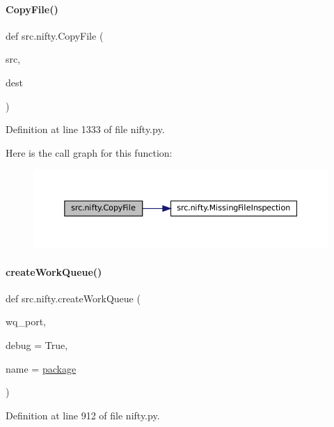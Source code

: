 \paragraph{\texorpdfstring{Copy\+File()}{CopyFile()}}
{\footnotesize\ttfamily def src.\+nifty.\+Copy\+File (\begin{DoxyParamCaption}\item[{}]{src,  }\item[{}]{dest }\end{DoxyParamCaption})}



Definition at line 1333 of file nifty.\+py.

Here is the call graph for this function\+:
\nopagebreak
\begin{figure}[H]
\begin{center}
\leavevmode
\includegraphics[width=350pt]{namespacesrc_1_1nifty_a688498187c471801b1e64fd7f4e35424_cgraph}
\end{center}
\end{figure}
\mbox{\label{namespacesrc_1_1nifty_a262a760d693a4633e0b0474912654cce}} 
\paragraph{\texorpdfstring{create\+Work\+Queue()}{createWorkQueue()}}
{\footnotesize\ttfamily def src.\+nifty.\+create\+Work\+Queue (\begin{DoxyParamCaption}\item[{}]{wq\+\_\+port,  }\item[{}]{debug = {\ttfamily True},  }\item[{}]{name = {\ttfamily \hyperlink{namespacesrc_1_1nifty_a4c9c65626bf4784905a24e3669495270}{package}} }\end{DoxyParamCaption})}



Definition at line 912 of file nifty.\+py.

\mbox{\label{namespacesrc_1_1nifty_acb6e901ddc75a719c456d75db970f02d}} 
